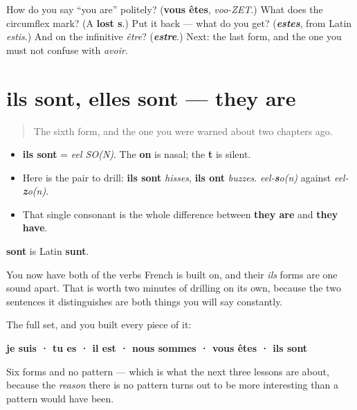 \begin{tcolorbox}[breakable,colback=teal!4,colframe=teal!35!black,title={Before you move on}]
How do you say \textquotedblleft{}you are\textquotedblright{} politely? (\textbf{vous êtes}, \emph{voo-ZET}.) What does the circumflex mark? (A \textbf{lost s}.) Put it back — what do you get? (\emph{\textbf{estes}}, from Latin \emph{estis}.) And on the infinitive \emph{être}? (\emph{\textbf{estre}}.) Next: the last form, and the one you must not confuse with \emph{avoir}.
\end{tcolorbox}
\section[ils sont, elles sont]{ils sont, elles sont — they are}

\label{lesson:FR-C16-sont}



\begin{quote}
The sixth form, and the one you were warned about two chapters ago.
\end{quote}

\begin{sounds}
\begin{itemize}
\raggedright
  \item \textbf{ils sont} = \emph{eel SO(N)}. The \textbf{on} is nasal; the \textbf{t} is silent.
  \item Here is the pair to drill: \textbf{ils sont} \emph{hisses}, \textbf{ils ont} \emph{buzzes}. \emph{eel-\textbf{s}o(n)} against \emph{eel-\textbf{z}o(n)}.
  \item That single consonant is the whole difference between \textbf{they are} and \textbf{they have}.
\end{itemize}
\end{sounds}

\begin{cousinweb}
\textbf{sont} is Latin \textbf{sunt}.

You now have both of the verbs French is built on, and their \emph{ils} forms are one sound apart. That is worth two minutes of drilling on its own, because the two sentences it distinguishes are both things you will say constantly.

The full set, and you built every piece of it:

\textbf{je suis · tu es · il est · nous sommes · vous êtes · ils sont}

Six forms and no pattern — which is what the next three lessons are about, because the \emph{reason} there is no pattern turns out to be more interesting than a pattern would have been.
\end{cousinweb}

